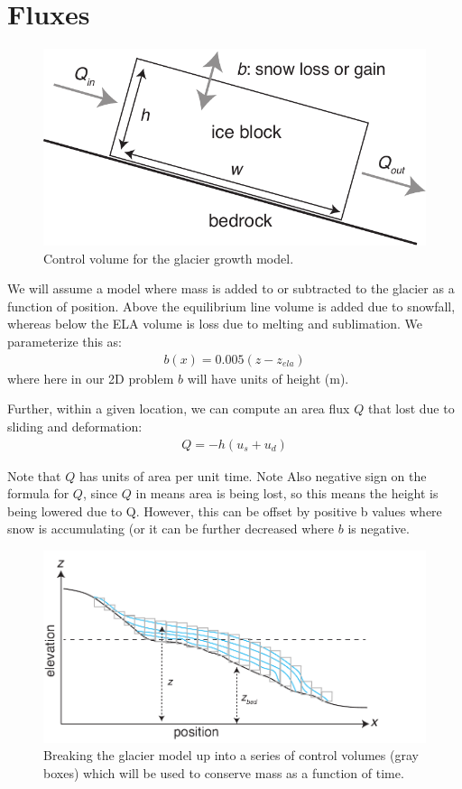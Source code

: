\documentclass[11pt, oneside]{article}   	%
\begin{document}
\section*{Fluxes} 
\begin{figure}[htbp]
\begin{center}
\includegraphics[width=.8\textwidth]{block.pdf}
\caption{Control volume for the glacier growth model.}
\label{default}
\end{center}
\end{figure}
We will assume a model where mass is added to or subtracted to the glacier as a function of position. Above the equilibrium line volume is added due to snowfall, whereas below the ELA volume is loss due to melting and sublimation. We parameterize this as:
\begin{eqnarray}
	b(x) = 0.005 (z- z_{ela}) 
\end{eqnarray}
where here in our 2D problem $b$ will have units of height (m). 

Further, within a given location, we can compute an area flux $Q$ that  lost due to sliding and deformation:
\begin{eqnarray}
	Q = -h ( u_s + u_d)
\end{eqnarray}

Note that $Q$ has units of area per unit time.  Note Also negative sign on the formula for $Q$, since  $Q$ in  means area is being lost, so this means the height is being lowered due to Q. However,  this can be offset by positive b values where snow is accumulating (or it can be further decreased where $b$ is negative.


\begin{figure}[htbp]
\begin{center}
\includegraphics[width=.8\textwidth]{glacier_volumes.pdf}
\caption{Breaking the glacier model up into a series of control volumes (gray boxes) which will be used to conserve mass as a function of time.}
\label{fig:volumes}
\end{center}
\end{figure}
\end{document}
